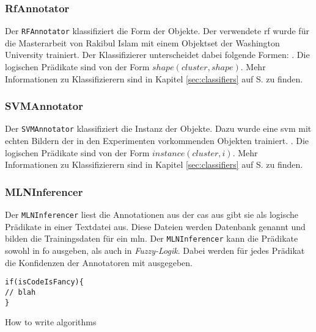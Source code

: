 \subsubsection{RfAnnotator}
 Der \texttt{RFAnnotator} klassifiziert die Form der Objekte. Der verwendete \gls{rf} wurde für die Masterarbeit von Rakibul Islam \cite{rakib} mit einem Objektset der Washington University trainiert. Der Klassifizierer unterscheidet dabei folgende Formen: . Die logischen Prädikate sind von der Form  $shape(cluster, shape)$. Mehr Informationen zu Klassifizierern sind in Kapitel \ref{sec:classifiers} auf S. \pageref{sec:classifiers} zu finden.

\subsubsection{SVMAnnotator}
 Der \texttt{SVMAnnotator} klassifiziert die Instanz der Objekte. Dazu wurde eine \gls{svm} mit echten Bildern  der in den Experimenten vorkommenden Objekten trainiert. . Die logischen Prädikate sind von der Form  $instance(cluster, i)$. Mehr Informationen zu Klassifizierern sind in Kapitel \ref{sec:classifiers} auf S. \pageref{sec:classifiers} zu finden.

\subsubsection{MLNInferencer}
Der \texttt{MLNInferencer} liest die Annotationen aus der \gls{cas} aus gibt sie als logische Prädikate in einer Textdatei aus. Diese Dateien werden Datenbank genannt und bilden die Trainingsdaten für ein \gls{mln}. Der \texttt{MLNInferencer} kann die Prädikate sowohl in \gls{fo} ausgeben, als auch in \textit{Fuzzy-Logik}. Dabei werden für jedes Prädikat die Konfidenzen der Annotatoren mit ausgegeben.

\begin{algorithm}[H]
\begin{lstlisting}
if(isCodeIsFancy){
// blah
}
\end{lstlisting}
 \caption{How to write algorithms}
\end{algorithm}
